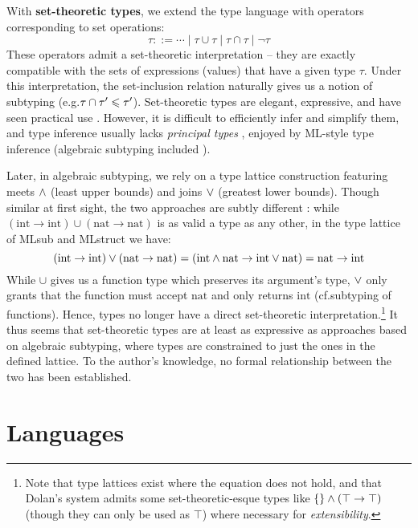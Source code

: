 With \textbf{set-theoretic types}, we extend the type language with operators corresponding to set operations:
$$ \tau ::= \cdots \mid \tau \cup \tau \mid \tau \cap \tau \mid \lnot \tau $$
These operators admit a set-theoretic interpretation -- they are exactly compatible with the sets of expressions (values) that have a given type $\tau$. 
Under this interpretation, the set-inclusion relation naturally gives us a notion of subtyping (e.g.\@ $\tau \cap \tau' \leqslant \tau'$).
Set-theoretic types are elegant, expressive, and have seen practical use \cite{set-theoretic-types-for-elixir, set-theoretic-types-for-erlang}. However, it is difficult to efficiently infer and simplify them, and type inference usually lacks \emph{principal types} \cite{polymorphic-set-theoretic-types, castagna-polymorphic-variants, castagna-dynamic}, enjoyed by ML-style type inference (algebraic subtyping included \cite{mlstruct, castagna-dynamic}). 

Later, in algebraic subtyping, we rely on a type lattice construction featuring meets $\land$ (least upper bounds) and joins $\lor$ (greatest lower bounds). Though similar at first sight, the two approaches are subtly different \cite{mlstruct}: while $(\mathrm{int} \to \mathrm{int}) \cup (\mathrm{nat} \to \mathrm{nat})$ is as valid a type as any other, in the type lattice of MLsub \cite{mlsub} and MLstruct \cite{mlstruct} we have: $$(\mathrm{int} \to \mathrm{int}) \lor (\mathrm{nat} \to \mathrm{nat}) = (\mathrm{int} \land \mathrm{nat} \to \mathrm{int} \lor \mathrm{nat}) = \mathrm{nat} \to \mathrm{int} $$
While $\cup$ gives us a function type which preserves its argument's type, $\lor$ only grants that the function must accept $\mathrm{nat}$ and only returns $\mathrm{int}$ (cf.\@ subtyping of functions).
Hence, types no longer have a direct set-theoretic interpretation.\footnote{Note that type lattices exist where the equation does not hold, and that Dolan's system admits some set-theoretic-esque types like $\{\} \land (\top \to \top)$ (though they can only be used as $\top$) where necessary for \emph{extensibility}.} It thus seems that set-theoretic types are at least as expressive as approaches based on algebraic subtyping, where types are constrained to just the ones in the defined lattice. To the author's knowledge, no formal relationship between the two has been established.

\section{Languages}
\label{sec:languages}

